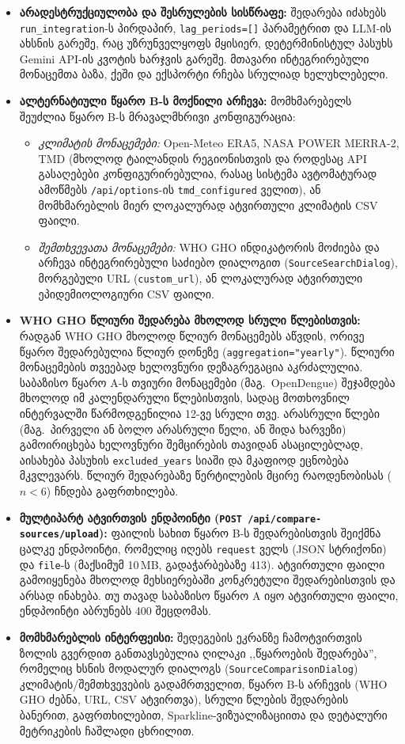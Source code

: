 \documentclass[11pt,a4paper]{article}
\begin{document}
\begin{itemize}[leftmargin=1.4em]
    პლატფორმა ხაზგასმით აფრთხილებს მომხმარებელს, რომ შედარება საორიენტაციოა და არ წარმოადგენს სტატისტიკური მნიშვნელოვნობის ტესტს.
  \item \textbf{არადესტრუქციულობა და შესრულების სისწრაფე:} შედარება იძახებს
    \texttt{run\_integration}-ს პირდაპირ, \texttt{lag\_periods=[]} პარამეტრით და LLM-ის ახსნის გარეშე,
    რაც უზრუნველყოფს მყისიერ, დეტერმინისტულ პასუხს Gemini API-ის კვოტის ხარჯვის გარეშე.
    მთავარი ინტეგრირებული მონაცემთა ბაზა, ქეში და ექსპორტი რჩება სრულიად ხელუხლებელი.
  \item \textbf{ალტერნატიული წყარო B-ს მოქნილი არჩევა:}
    მომხმარებელს შეუძლია წყარო B-ს მრავალმხრივი კონფიგურაცია:
    \begin{itemize}
      \item \emph{კლიმატის მონაცემები:} Open-Meteo ERA5, NASA POWER MERRA-2, TMD (მხოლოდ ტაილანდის რეგიონისთვის და როდესაც API გასაღებები კონფიგურირებულია, რასაც სისტემა ავტომატურად ამოწმებს \texttt{/api/options}-ის \texttt{tmd\_configured} ველით), ან მომხმარებლის მიერ ლოკალურად ატვირთული კლიმატის CSV ფაილი.
      \item \emph{შემთხვევათა მონაცემები:} WHO GHO ინდიკატორის მოძიება და არჩევა ინტეგრირებული საძიებო დიალოგით (\texttt{SourceSearchDialog}), მორგებული URL (\texttt{custom\_url}), ან ლოკალურად ატვირთული ეპიდემიოლოგიური CSV ფაილი.
    \end{itemize}
  \item \textbf{WHO GHO წლიური შედარება მხოლოდ სრული წლებისთვის:} რადგან WHO GHO
    მხოლოდ წლიურ მონაცემებს აწვდის, ორივე წყარო შედარებულია წლიურ დონეზე (\texttt{aggregation="yearly"}).
    წლიური მონაცემების თვეებად ხელოვნური დეზაგრეგაცია აკრძალულია. საბაზისო წყარო A-ს
    თვიური მონაცემები (მაგ.\ OpenDengue) შეჯამდება მხოლოდ იმ კალენდარული წლებისთვის,
    სადაც მოთხოვნილ ინტერვალში წარმოდგენილია 12-ვე სრული თვე. არასრული წლები (მაგ.\ პირველი ან ბოლო არასრული წელი, ან შიდა ხარვეზი)
    გამოირიცხება ხელოვნური შემცირების თავიდან ასაცილებლად, აისახება პასუხის \texttt{excluded\_years}
    სიაში და მკაფიოდ ეცნობება მკვლევარს. წლიურ შედარებაზე წერტილების მცირე რაოდენობისას ($n < 6$)
    ჩნდება გაფრთხილება.
  \item \textbf{მულტიპარტ ატვირთვის ენდპოინტი (\texttt{POST /api/compare-sources/upload}):}
    ფაილის სახით წყარო B-ს შედარებისთვის შეიქმნა ცალკე ენდპოინტი, რომელიც იღებს
    \texttt{request} ველს (JSON სტრიქონი) და \texttt{file}-ს (მაქსიმუმ 10\,MB, გადაჭარბებაზე 413).
    ატვირთული ფაილი გამოიყენება მხოლოდ მეხსიერებაში კონკრეტული შედარებისთვის და არსად ინახება.
    თუ თავად საბაზისო წყარო A იყო ატვირთული ფაილი, ენდპოინტი აბრუნებს 400 შეცდომას.
  \item \textbf{მომხმარებლის ინტერფეისი:} შედეგების ეკრანზე ჩამოტვირთვის ზოლის გვერდით
    განთავსებულია ღილაკი ,,წყაროების შედარება'', რომელიც ხსნის მოდალურ დიალოგს
    (\texttt{SourceComparisonDialog}) კლიმატის/შემთხვევების გადამრთველით, წყარო B-ს არჩევის (WHO GHO ძებნა, URL, CSV ატვირთვა),
    სრული წლების შედარების ბანერით, გაფრთხილებით, Sparkline-ვიზუალიზაციითა და დეტალური მეტრიკების ჩაშლადი ცხრილით.
\end{itemize}
\end{document}
